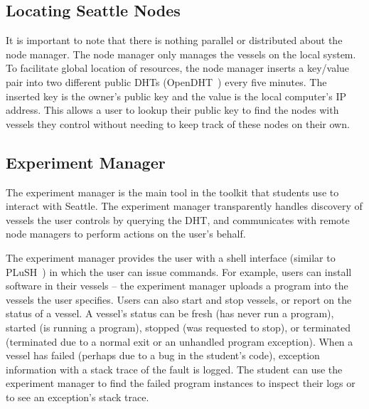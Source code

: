 %

\subsection{Locating Seattle Nodes}
\label{sec-locationservice}

It is important to note that there is nothing parallel or distributed
about the node manager. The node manager only manages the vessels on
the local system. To facilitate global location of resources, the node
manager inserts a key/value pair into two different public DHTs
(OpenDHT~\cite{Rhea_SIGCOMM_2005}) every five minutes. The inserted key is
the owner's public key and the value is the local computer's IP
address. This allows a user to lookup their public key to find
the nodes with vessels they control without needing to keep track of
these nodes on their own.

\subsection{Experiment Manager}
\label{sec-experimentmanager}

The experiment manager is the main tool in the toolkit that students use
to interact with Seattle. The experiment manager
transparently handles discovery of vessels the user controls by
querying the DHT, and communicates with remote node managers to perform
actions on the user's behalf.

The experiment manager provides the user with a shell interface
(similar to PLuSH~\cite{Albrecht_LISA_2007}) in which the user can
issue commands. For example, users can install software in their
vessels -- the experiment manager uploads a program into the vessels
the user specifies. Users can also start and stop vessels, or report
on the status of a vessel. A vessel's status can be fresh (has never
run a program), started (is running a program), stopped (was requested
to stop), or terminated (terminated due to a normal exit or an unhandled 
program exception). When a vessel has failed
(perhaps due to a bug in the student's code), exception information
with a stack trace of the fault is logged. The student can use
the experiment manager to find the failed program instances to inspect
their logs or to see an exception's stack trace.


